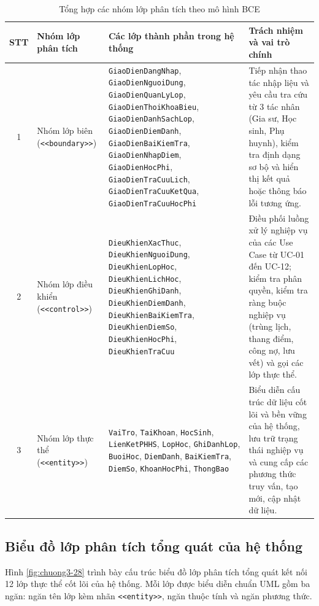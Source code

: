 \begin{table}[H]
\centering
\caption{Tổng hợp các nhóm lớp phân tích theo mô hình BCE}
\label{tab:bce-summary}
\begin{tabularx}{\textwidth}{@{}c >{\raggedright\arraybackslash}p{3.0cm} >{\raggedright\arraybackslash}X >{\raggedright\arraybackslash}X@{}}
\toprule
\textbf{STT} & \textbf{Nhóm lớp phân tích} & \textbf{Các lớp thành phần trong hệ thống} & \textbf{Trách nhiệm và vai trò chính} \\
\midrule
1 & Nhóm lớp biên (\texttt{<<boundary>>}) & \texttt{GiaoDienDangNhap}, \texttt{GiaoDienNguoiDung}, \texttt{GiaoDienQuanLyLop}, \texttt{GiaoDienThoiKhoaBieu}, \texttt{GiaoDienDanhSachLop}, \texttt{GiaoDienDiemDanh}, \texttt{GiaoDienBaiKiemTra}, \texttt{GiaoDienNhapDiem}, \texttt{GiaoDienHocPhi}, \texttt{GiaoDienTraCuuLich}, \texttt{GiaoDienTraCuuKetQua}, \texttt{GiaoDienTraCuuHocPhi} & Tiếp nhận thao tác nhập liệu và yêu cầu tra cứu từ 3 tác nhân (Gia sư, Học sinh, Phụ huynh), kiểm tra định dạng sơ bộ và hiển thị kết quả hoặc thông báo lỗi tương ứng. \\
\midrule
2 & Nhóm lớp điều khiển (\texttt{<<control>>}) & \texttt{DieuKhienXacThuc}, \texttt{DieuKhienNguoiDung}, \texttt{DieuKhienLopHoc}, \texttt{DieuKhienLichHoc}, \texttt{DieuKhienGhiDanh}, \texttt{DieuKhienDiemDanh}, \texttt{DieuKhienBaiKiemTra}, \texttt{DieuKhienDiemSo}, \texttt{DieuKhienHocPhi}, \texttt{DieuKhienTraCuu} & Điều phối luồng xử lý nghiệp vụ của các Use Case từ UC-01 đến UC-12; kiểm tra phân quyền, kiểm tra ràng buộc nghiệp vụ (trùng lịch, thang điểm, công nợ, lưu vết) và gọi các lớp thực thể. \\
\midrule
3 & Nhóm lớp thực thể (\texttt{<<entity>>}) & \texttt{VaiTro}, \texttt{TaiKhoan}, \texttt{HocSinh}, \texttt{LienKetPHHS}, \texttt{LopHoc}, \texttt{GhiDanhLop}, \texttt{BuoiHoc}, \texttt{DiemDanh}, \texttt{BaiKiemTra}, \texttt{DiemSo}, \texttt{KhoanHocPhi}, \texttt{ThongBao} & Biểu diễn cấu trúc dữ liệu cốt lõi và bền vững của hệ thống, lưu trữ trạng thái nghiệp vụ và cung cấp các phương thức truy vấn, tạo mới, cập nhật dữ liệu. \\
\bottomrule
\end{tabularx}
\end{table}

\subsection{Biểu đồ lớp phân tích tổng quát của hệ thống}

Hình \ref{fig:chuong3-28} trình bày cấu trúc biểu đồ lớp phân tích tổng quát kết nối 12 lớp thực thể cốt lõi của hệ thống. Mỗi lớp được biểu diễn chuẩn UML gồm ba ngăn: ngăn tên lớp kèm nhãn \texttt{<<entity>>}, ngăn thuộc tính và ngăn phương thức.

